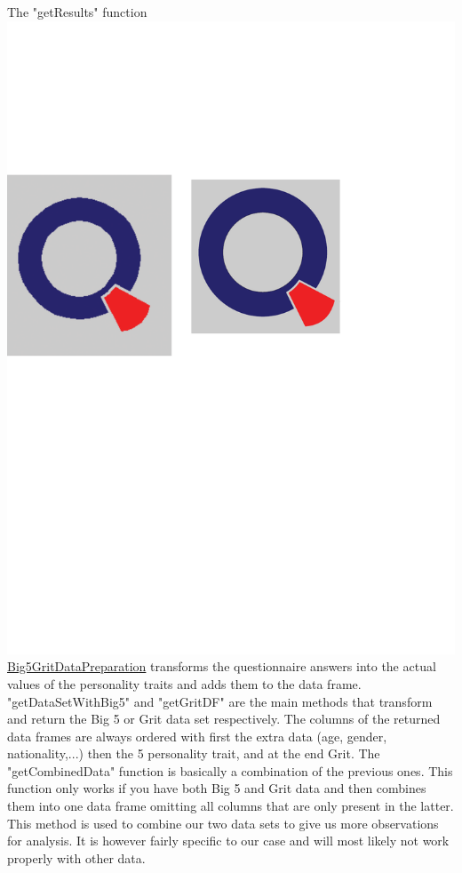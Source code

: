\newline
The "getResults" function \href{https://github.com/Matthias2193/SPL/blob/96a61ea2293d61c99c075877aca3accc1c847a22/Big5GritDataPreparation/Big5GritDataPreparation.R#L161-L195}{\includegraphics[scale = 0.06]{Figures/qletlogo.pdf}Big5GritDataPreparation} transforms the questionnaire answers into the actual values of the personality traits and adds them to the data frame.
\newline
"getDataSetWithBig5" and "getGritDF" are the main methods that transform and return the Big 5 or Grit data set respectively. The columns of the returned data frames are always ordered with first the extra data (age, gender, nationality,...) then the 5 personality trait, and at the end Grit.
\newline
The "getCombinedData" function is basically a combination of the previous ones. This function only works if you have both Big 5 and Grit data and then combines them into one data frame omitting all columns that are only present in the latter. This method is used to combine our two data sets to give us more observations for analysis. It is however fairly specific to our case and will most likely not work properly with other data.
